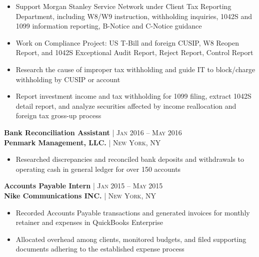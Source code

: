 \documentclass[10pt]{article} %
\begin{document}
{\begin{minipage}[t]{0.5\textwidth}
\begin{itemize}[leftmargin=*, topsep=2pt, partopsep=2.5pt]
\item Support Morgan Stanley Service Network under Client Tax Reporting Department, including W8/W9 instruction, withholding inquiries, 1042S and 1099 information reporting, B-Notice and C-Notice guidance

\item Work on Compliance Project: US T-Bill and foreign CUSIP, W8 Reopen Report, and 1042S Exceptional Audit Report, Reject Report, Control Report 

\item Research the cause of improper tax withholding and guide IT to block/charge withholding by CUSIP or account

\item Report investment income and tax withholding for 1099 filing, extract 1042S detail report, and analyze securities affected by income reallocation and foreign tax gross-up process

\end{itemize}


{\raggedright\normalsize
\textbf{Bank Reconciliation Assistant} {\hfill\footnotesize\textsc{| Jan 2016 -- May 2016}} \\ 
\textbf{Penmark Management, LLC.} {\hfill\footnotesize\textsc{| New York, NY}}}

\begin{itemize}[leftmargin=*, topsep=2pt, partopsep=2.5pt]
\setlength\itemsep{1pt}
\item Researched discrepancies and reconciled bank deposits and withdrawals to operating cash in general ledger for over 150 accounts
\end{itemize}



{\raggedright\normalsize
\textbf{Accounts Payable Intern} {\hfill\footnotesize\textsc{| Jan 2015 -- May 2015}} \\ 
\textbf{Nike Communications INC.} {\hfill\footnotesize\textsc{| New York, NY}}}

\begin{itemize}[leftmargin=*, topsep=2pt, partopsep=2.5pt]
\setlength\itemsep{1pt}
\item Recorded Accounts Payable transactions and generated invoices for monthly retainer and expenses in QuickBooks Enterprise 
\item Allocated overhead among clients, monitored budgets, and filed supporting documents adhering to the established expense process  
\end{itemize}



\end{minipage}}
\end{document}
